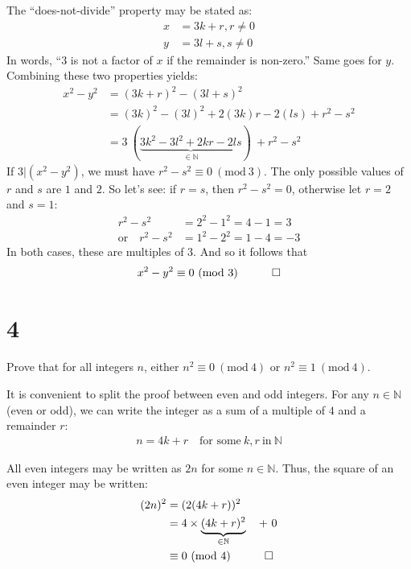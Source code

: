 \documentclass[12pt]{article}
\newcommand{\modulo}[1]{~(\mathrm{mod}~#1)}
\begin{document}
The ``does-not-divide'' property may be stated as:
\begin{align*}
x & = 3k + r, r\neq 0 \\
y & = 3l + s, s\neq 0
\end{align*}
In words, ``$3$ is not a factor of $x$ if the remainder is non-zero.'' Same goes for $y$. Combining these two properties yields:
\begin{align*}
x^{2}-y^{2} 
 & = (3k + r)^{2} - (3l + s)^{2} \\
 & = (3k)^{2} - (3l)^{2} + 2(3k)r - 2(ls) + r^{2} - s^{2} \\
 & = 3 ~(\underbrace{3k^{2}-3l^{2}+2kr-2ls}_{\in\mathbb{N}})~ + r^{2} - s^{2}
\end{align*}
If $3|(x^{2}-y^{2})$, we must have $r^{2}-s^{2}\equiv0\modulo{3}$. The only possible values of $r$ and $s$ are $1$ and $2$. So let's see: if $r=s$, then $r^{2}-s^{2}=0$, otherwise let $r=2$ and $s=1$:
\begin{align*}
r^{2} - s^{2} 
  & = 2^{2} - 1^{2} = 4 - 1 = 3 \\
\text{or}\quad r^{2} - s^{2} 
  & = 1^{2} - 2^{2} = 1 - 4 = -3
\end{align*}
In both cases, these are multiples of $3$. And so it follows that
\begin{align*}
x^{2}-y^{2} \equiv 0 \modulo{3} \quad \qed 
\end{align*}

\clearpage
\section*{4}
\begin{question}
Prove that for all integers $n$, either $n^{2}\equiv 0\modulo{4}$ or $n^{2}\equiv 1\modulo{4}$.
\end{question}

It is convenient to split the proof between even and odd integers. For any $n\in\mathbb{N}$ (even or odd), we can write the integer as a sum of a multiple of $4$ and a remainder $r$:
\begin{align*}
n = 4k + r \quad\text{for some}~k,r~\text{in}~\mathbb{N}
\end{align*}

All even integers may be written as $2n$ for some $n\in\mathbb{N}$. Thus, the square of an even integer may be written:
\begin{align*}
(2n)^{2} 
  & = (2(4k + r))^{2} \\
  & = 4 \times \underbrace{(4k + r)^{2}}_{\in\mathbb{N}} \quad +~ 0 \\
  & \equiv 0\modulo{4} \quad \qed
\end{align*}
\end{document}
